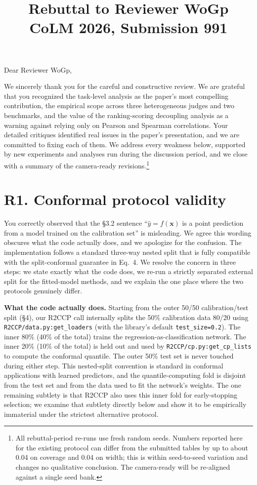 \documentclass[11pt]{article}
\title{Rebuttal to Reviewer WoGp\\
\large CoLM 2026, Submission 991}
\author{}
\date{}
\begin{document}
\maketitle

Dear Reviewer WoGp,

We sincerely thank you for the careful and constructive review. We are grateful that you recognized the task-level analysis as the paper's most compelling contribution, the empirical scope across three heterogeneous judges and two benchmarks, and the value of the ranking-scoring decoupling analysis as a warning against relying only on Pearson and Spearman correlations. Your detailed critiques identified real issues in the paper's presentation, and we are committed to fixing each of them. We address every weakness below, supported by new experiments and analyses run during the discussion period, and we close with a summary of the camera-ready revisions.\footnote{All rebuttal-period re-runs use fresh random seeds. Numbers reported here for the existing protocol can differ from the submitted tables by up to about 0.04 on coverage and 0.04 on width; this is within seed-to-seed variation and changes no qualitative conclusion. The camera-ready will be re-aligned against a single seed bank.}

\section*{R1. Conformal protocol validity}

You correctly observed that the \S 3.2 sentence ``$\hat{y} = f(\mathbf{x})$ is a point prediction from a model trained on the calibration set'' is misleading. We agree this wording obscures what the code actually does, and we apologize for the confusion. The implementation follows a standard three-way nested split that is fully compatible with the split-conformal guarantee in Eq.\ 4. We resolve the concern in three steps: we state exactly what the code does, we re-run a strictly separated external split for the fitted-model methods, and we explain the one place where the two protocols genuinely differ.

\textbf{What the code actually does.} Starting from the outer 50/50 calibration/test split (\S 4), our R2CCP call internally splits the 50\% calibration data 80/20 using \texttt{R2CCP/}\allowbreak\texttt{data.py:}\allowbreak\texttt{get\_loaders} (with the library's default \texttt{test\_size=0.2}). The inner 80\% (40\% of the total) trains the regression-as-classification network. The inner 20\% (10\% of the total) is held out and used by \texttt{R2CCP/}\allowbreak\texttt{cp.py:}\allowbreak\texttt{get\_cp\_lists} to compute the conformal quantile. The outer 50\% test set is never touched during either step. This nested-split convention is standard in conformal applications with learned predictors, and the quantile-computing fold is disjoint from the test set and from the data used to fit the network's weights. The one remaining subtlety is that R2CCP also uses this inner fold for early-stopping selection; we examine that subtlety directly below and show it to be empirically immaterial under the strictest alternative protocol.
\end{document}
